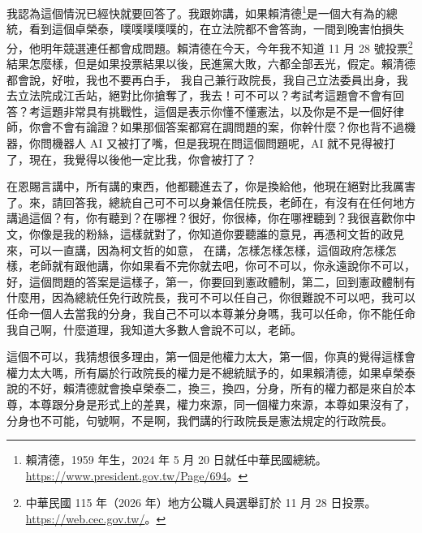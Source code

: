 \hypertarget{c08:cue:110}{}我認為這個情況已經快就要回答了。我跟妳講，如果賴清德\footnote{賴清德，1959 年生，2024 年 5 月 20 日就任中華民國總統。\url{https://www.president.gov.tw/Page/694}。}是一個大有為的總統，看到這個卓榮泰，噗噗噗噗噗的，在立法院都不會答詢，一間到晚害怕損失分，他明年競選連任都會成問題。賴清德在今天，今年我不知道 11 月 28 號投票\footnote{中華民國 115 年（2026 年）地方公職人員選舉訂於 11 月 28 日投票。\url{https://web.cec.gov.tw/}。}結果怎麼樣，但是如果投票結果以後，民進黨大敗，六都全部丟光，假定。賴清德都會說，好啦，我也不要再白手，
\hypertarget{c08:cue:111}{}我自己兼行政院長，我自己立法委員出身，我去立法院成江舌站，絕對比你搶奪了，我去！可不可以？考試考這題會不會有回答？考這題非常具有挑戰性，這個是表示你懂不懂憲法，以及你是不是一個好律師，你會不會有論證？如果那個答案都寫在調問題的案，你幹什麼？你也背不過機器，你問機器人 AI 又被打了嘴，但是我現在問這個問題呢，AI 就不見得被打了，現在，我覺得以後他一定比我，你會被打了？

\hypertarget{c08:cue:112}{}在恩賜言講中，所有講的東西，他都聽進去了，你是換給他，他現在絕對比我厲害了。來，請回答我，總統自己可不可以身兼信任院長，老師在，有沒有在任何地方講過這個？有，你有聽到？在哪裡？很好，你很棒，你在哪裡聽到？我很喜歡你中文，你像是我的粉絲，這樣就對了，你知道你要聽誰的意見，再憑柯文哲的政見來，可以一直講，因為柯文哲的如意，
\hypertarget{c08:cue:113}{}在講，怎樣怎樣怎樣，這個政府怎樣怎樣，老師就有跟他講，你如果看不完你就去吧，你可不可以，你永遠說你不可以，好，這個問題的答案是這樣子，第一，你要回到憲政體制，第二，回到憲政體制有什麼用，因為總統任免行政院長，我可不可以任自己，你很難說不可以吧，我可以任命一個人去當我的分身，我自己不可以本尊兼分身嗎，我可以任命，你不能任命我自己啊，什麼道理，我知道大多數人會說不可以，老師。

\hypertarget{c08:cue:114}{}這個不可以，我猜想很多理由，第一個是他權力太大，第一個，你真的覺得這樣會權力太大嗎，所有屬於行政院長的權力是不總統賦予的，如果賴清德，如果卓榮泰說的不好，賴清德就會換卓榮泰二，換三，換四，分身，所有的權力都是來自於本尊，本尊跟分身是形式上的差異，權力來源，同一個權力來源，本尊如果沒有了，分身也不可能，句號啊，不是啊，我們講的行政院長是憲法規定的行政院長。

